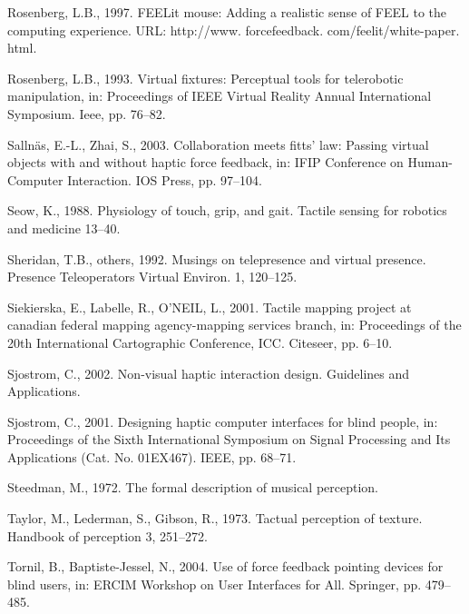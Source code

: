 \documentclass[
]{book}
\newlength{\cslhangindent}
\newlength{\cslentryspacingunit} %
\newenvironment{CSLReferences}[2] %
 {%
  \setlength{\parindent}{0pt}
  \ifodd #1
  \let\oldpar\par
  \def\par{\hangindent=\cslhangindent\oldpar}
  \fi
  \setlength{\parskip}{#2\cslentryspacingunit}
 }%
 {}
\begin{document}
\begin{CSLReferences}{1}{0}
\leavevmode{}%
Rosenberg, L.B., 1997. FEELit mouse: Adding a realistic sense of FEEL to the computing experience. URL: http://www. forcefeedback. com/feelit/white-paper. html.

\leavevmode{}%
Rosenberg, L.B., 1993. Virtual fixtures: Perceptual tools for telerobotic manipulation, in: Proceedings of IEEE Virtual Reality Annual International Symposium. Ieee, pp. 76--82.

\leavevmode{}%
Sallnäs, E.-L., Zhai, S., 2003. Collaboration meets fitts' law: Passing virtual objects with and without haptic force feedback, in: IFIP Conference on Human-Computer Interaction. IOS Press, pp. 97--104.

\leavevmode{}%
Seow, K., 1988. Physiology of touch, grip, and gait. Tactile sensing for robotics and medicine 13--40.

\leavevmode{}%
Sheridan, T.B., others, 1992. Musings on telepresence and virtual presence. Presence Teleoperators Virtual Environ. 1, 120--125.

\leavevmode{}%
Siekierska, E., Labelle, R., O'NEIL, L., 2001. Tactile mapping project at canadian federal mapping agency-mapping services branch, in: Proceedings of the 20th International Cartographic Conference, ICC. Citeseer, pp. 6--10.

\leavevmode{}%
Sjostrom, C., 2002. Non-visual haptic interaction design. Guidelines and Applications.

\leavevmode{}%
Sjostrom, C., 2001. Designing haptic computer interfaces for blind people, in: Proceedings of the Sixth International Symposium on Signal Processing and Its Applications (Cat. No. 01EX467). IEEE, pp. 68--71.

\leavevmode{}%
Steedman, M., 1972. The formal description of musical perception.

\leavevmode{}%
Taylor, M., Lederman, S., Gibson, R., 1973. Tactual perception of texture. Handbook of perception 3, 251--272.

\leavevmode{}%
Tornil, B., Baptiste-Jessel, N., 2004. Use of force feedback pointing devices for blind users, in: ERCIM Workshop on User Interfaces for All. Springer, pp. 479--485.


\end{CSLReferences}
\end{document}

